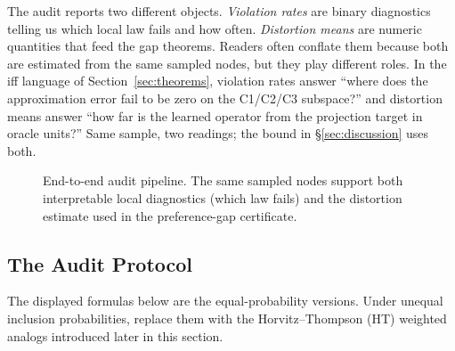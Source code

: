 The audit reports two different objects. \emph{Violation rates} are binary diagnostics telling us which local law fails and how often. \emph{Distortion means} are numeric quantities that feed the gap theorems. Readers often conflate them because both are estimated from the same sampled nodes, but they play different roles. In the iff language of Section~\ref{sec:theorems}, violation rates answer ``where does the approximation error fail to be zero on the C1/C2/C3 subspace?'' and distortion means answer ``how far is the learned operator from the projection target in oracle units?'' Same sample, two readings; the bound in \S\ref{sec:discussion} uses both.

\begin{figure}[t]
\centering
{}
\caption{End-to-end audit pipeline. The same sampled nodes support both interpretable local diagnostics (which law fails) and the distortion estimate used in the preference-gap certificate.}
\label{fig:audit-pipeline}
\end{figure}

\subsection{The Audit Protocol}

The displayed formulas below are the equal-probability versions. Under unequal inclusion probabilities, replace them with the Horvitz--Thompson (HT) weighted analogs introduced later in this section.

